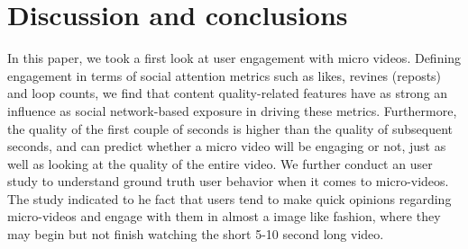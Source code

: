 \section{Discussion and conclusions}
In this paper, we took a first look at user engagement with micro videos. Defining engagement in terms of social attention metrics such as likes, revines (reposts) and loop counts, we find that content quality-related features have as strong an influence as social network-based exposure in driving these metrics. Furthermore, the quality of the first couple of seconds is higher than the quality of subsequent seconds, and can predict whether a micro video will be engaging or not, just as well as looking at the quality of the entire video. We further conduct an user study to understand ground truth user behavior when it comes to micro-videos. The study indicated to he fact that users tend to make quick opinions regarding micro-videos and engage with them in almost a image like fashion, where they may begin but not finish  watching the short 5-10 second long video. 


